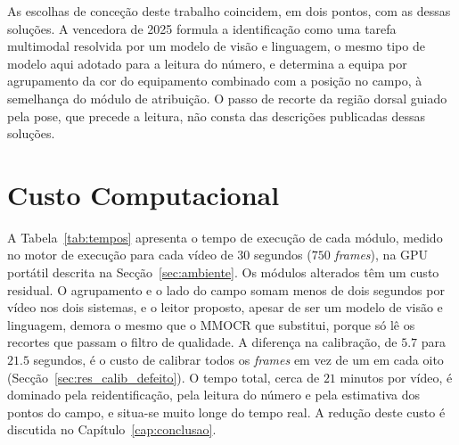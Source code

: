 As escolhas de conceção deste trabalho coincidem, em dois pontos, com as dessas soluções. A vencedora de 2025 formula a identificação como uma tarefa multimodal resolvida por um modelo de visão e linguagem, o mesmo tipo de modelo aqui adotado para a leitura do número, e determina a equipa por agrupamento da cor do equipamento combinado com a posição no campo, à semelhança do módulo de atribuição. O passo de recorte da região dorsal guiado pela pose, que precede a leitura, não consta das descrições publicadas dessas soluções.

\section{Custo Computacional}\label{sec:res_tempos}

A Tabela~\ref{tab:tempos} apresenta o tempo de execução de cada módulo, medido no motor de execução para cada vídeo de $30$ segundos ($750$ \emph{frames}), na GPU portátil descrita na Secção~\ref{sec:ambiente}. Os módulos alterados têm um custo residual. O agrupamento e o lado do campo somam menos de dois segundos por vídeo nos dois sistemas, e o leitor proposto, apesar de ser um modelo de visão e linguagem, demora o mesmo que o MMOCR que substitui, porque só lê os recortes que passam o filtro de qualidade. A diferença na calibração, de $5.7$ para $21.5$ segundos, é o custo de calibrar todos os \emph{frames} em vez de um em cada oito (Secção~\ref{sec:res_calib_defeito}). O tempo total, cerca de $21$ minutos por vídeo, é dominado pela reidentificação, pela leitura do número e pela estimativa dos pontos do campo, e situa-se muito longe do tempo real. A redução deste custo é discutida no Capítulo~\ref{cap:conclusao}.

